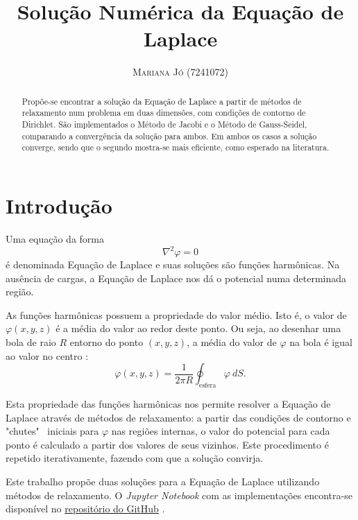 \documentclass[a4paper,12pt]{article}
\title{\vspace{-18mm}\fontsize{18pt}{20pt}\selectfont\textbf{
                    Solução Numérica da Equação de Laplace}} %
\author{
\large
\textsc{Mariana Jó (7241072)}\\
\vspace{-20pt}
}
\date{}
\begin{document}
\maketitle
\thispagestyle{fancy}

\begin{abstract}
  Propõe-se encontrar a solução da Equação de Laplace a partir de métodos de relaxamento num problema em duas dimensões, com condições de contorno de Dirichlet. São implementados o Método de Jacobi e o Método de Gauss-Seidel, comparando a convergência da solução para ambos. Em ambos os casos a solução converge, sendo que o segundo mostra-se mais eficiente, como esperado na literatura.
\end{abstract}

\section{Introdução}

Uma equação da forma
\begin{equation}
\nabla^2 \varphi = 0
\label{eq:laplace}
\end{equation}
é denominada Equação de Laplace e suas soluções são funções harmônicas. Na ausência de cargas, a Equação de Laplace nos dá o potencial numa determinada região.

As funções harmônicas possuem a propriedade do valor médio. Isto é, o valor de $\varphi (x, y, z)$ é a média
do valor ao redor deste ponto. Ou seja, ao desenhar uma bola de raio $R$ entorno do
ponto $(x, y, z)$, a média do valor de $\varphi$ na bola é igual ao valor no centro \cite{griffithsd.j1999}:
\begin{equation*}
  \varphi(x, y, z) = \frac{1}{2\pi R}\oint_{\text{esfera}}\varphi \ dS.
\end{equation*}

Esta propriedade das funções harmônicas nos permite resolver a Equação de Laplace
através de métodos de relaxamento: a partir das condições de contorno e "chutes" \ iniciais para $\varphi$ nas regiões internas, o valor do potencial para
cada ponto é calculado a partir dos valores de seus vizinhos. Este procedimento é
repetido iterativamente, fazendo com que a solução convirja.

Este trabalho propõe duas soluções para a Equação de Laplace utilizando métodos de relaxamento. O \textit{Jupyter Notebook} com as implementações encontra-se disponível no \href{https://github.com/marianajo/laplaces-equation}{repositório do GitHub} \cite{github}.
\end{document}
